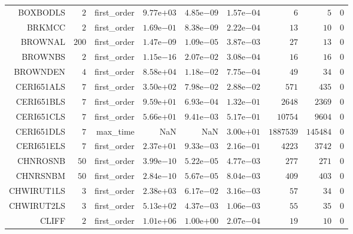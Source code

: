 \begin{longtable}{rrrrrrrrr}
BOXBODLS & \(     2\) & first\_order & \( 9.77\)e\(+03\) & \( 4.85\)e\(-09\) & \( 1.57\)e\(-04\) & \(     6\) & \(     5\) & \(     0\) \\
BRKMCC & \(     2\) & first\_order & \( 1.69\)e\(-01\) & \( 8.38\)e\(-09\) & \( 2.22\)e\(-04\) & \(    13\) & \(    10\) & \(     0\) \\
BROWNAL & \(   200\) & first\_order & \( 1.47\)e\(-09\) & \( 1.09\)e\(-05\) & \( 3.87\)e\(-03\) & \(    27\) & \(    13\) & \(     0\) \\
BROWNBS & \(     2\) & first\_order & \( 1.15\)e\(-16\) & \( 2.07\)e\(-02\) & \( 3.08\)e\(-04\) & \(    16\) & \(    16\) & \(     0\) \\
BROWNDEN & \(     4\) & first\_order & \( 8.58\)e\(+04\) & \( 1.18\)e\(-02\) & \( 7.75\)e\(-04\) & \(    49\) & \(    34\) & \(     0\) \\
CERI651ALS & \(     7\) & first\_order & \( 3.50\)e\(+02\) & \( 7.98\)e\(-02\) & \( 2.88\)e\(-02\) & \(   571\) & \(   435\) & \(     0\) \\
CERI651BLS & \(     7\) & first\_order & \( 9.59\)e\(+01\) & \( 6.93\)e\(-04\) & \( 1.32\)e\(-01\) & \(  2648\) & \(  2369\) & \(     0\) \\
CERI651CLS & \(     7\) & first\_order & \( 5.66\)e\(+01\) & \( 9.41\)e\(-03\) & \( 5.17\)e\(-01\) & \( 10754\) & \(  9604\) & \(     0\) \\
CERI651DLS & \(     7\) & max\_time &       NaN &       NaN & \( 3.00\)e\(+01\) & \(1887539\) & \(145484\) & \(     0\) \\
CERI651ELS & \(     7\) & first\_order & \( 2.37\)e\(+01\) & \( 9.33\)e\(-03\) & \( 2.16\)e\(-01\) & \(  4223\) & \(  3742\) & \(     0\) \\
CHNROSNB & \(    50\) & first\_order & \( 3.99\)e\(-10\) & \( 5.22\)e\(-05\) & \( 4.77\)e\(-03\) & \(   277\) & \(   271\) & \(     0\) \\
CHNRSNBM & \(    50\) & first\_order & \( 2.84\)e\(-10\) & \( 5.67\)e\(-05\) & \( 8.04\)e\(-03\) & \(   409\) & \(   403\) & \(     0\) \\
CHWIRUT1LS & \(     3\) & first\_order & \( 2.38\)e\(+03\) & \( 6.17\)e\(-02\) & \( 3.16\)e\(-03\) & \(    57\) & \(    34\) & \(     0\) \\
CHWIRUT2LS & \(     3\) & first\_order & \( 5.13\)e\(+02\) & \( 4.37\)e\(-03\) & \( 1.06\)e\(-03\) & \(    55\) & \(    35\) & \(     0\) \\
CLIFF & \(     2\) & first\_order & \( 1.01\)e\(+06\) & \( 1.00\)e\(+00\) & \( 2.07\)e\(-04\) & \(    19\) & \(    10\) & \(     0\) \\

\end{longtable}
